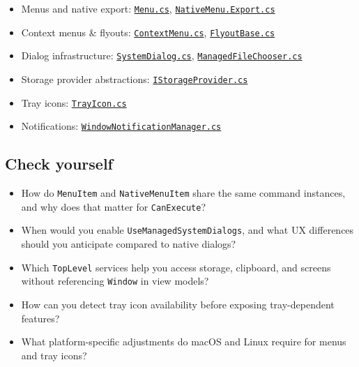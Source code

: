 \begin{itemize}
\tightlist
\item
  Menus and native export:
  \href{https://github.com/AvaloniaUI/Avalonia/blob/master/src/Avalonia.Controls/Menu.cs}{\passthrough{\lstinline!Menu.cs!}},
  \href{https://github.com/AvaloniaUI/Avalonia/blob/master/src/Avalonia.Controls/NativeMenu.Export.cs}{\passthrough{\lstinline!NativeMenu.Export.cs!}}
\item
  Context menus \& flyouts:
  \href{https://github.com/AvaloniaUI/Avalonia/blob/master/src/Avalonia.Controls/ContextMenu.cs}{\passthrough{\lstinline!ContextMenu.cs!}},
  \href{https://github.com/AvaloniaUI/Avalonia/blob/master/src/Avalonia.Controls/Flyouts/FlyoutBase.cs}{\passthrough{\lstinline!FlyoutBase.cs!}}
\item
  Dialog infrastructure:
  \href{https://github.com/AvaloniaUI/Avalonia/blob/master/src/Avalonia.Controls/SystemDialog.cs}{\passthrough{\lstinline!SystemDialog.cs!}},
  \href{https://github.com/AvaloniaUI/Avalonia/blob/master/src/Avalonia.Dialogs/ManagedFileChooser.cs}{\passthrough{\lstinline!ManagedFileChooser.cs!}}
\item
  Storage provider abstractions:
  \href{https://github.com/AvaloniaUI/Avalonia/blob/master/src/Avalonia.Base/Platform/Storage/IStorageProvider.cs}{\passthrough{\lstinline!IStorageProvider.cs!}}
\item
  Tray icons:
  \href{https://github.com/AvaloniaUI/Avalonia/blob/master/src/Avalonia.Controls/TrayIcon.cs}{\passthrough{\lstinline!TrayIcon.cs!}}
\item
  Notifications:
  \href{https://github.com/AvaloniaUI/Avalonia/blob/master/src/Avalonia.Controls.Notifications/WindowNotificationManager.cs}{\passthrough{\lstinline!WindowNotificationManager.cs!}}
\end{itemize}

\subsection{Check yourself}\label{check-yourself-11}

\begin{itemize}
\tightlist
\item
  How do \passthrough{\lstinline!MenuItem!} and
  \passthrough{\lstinline!NativeMenuItem!} share the same command
  instances, and why does that matter for
  \passthrough{\lstinline!CanExecute!}?
\item
  When would you enable
  \passthrough{\lstinline!UseManagedSystemDialogs!}, and what UX
  differences should you anticipate compared to native dialogs?
\item
  Which \passthrough{\lstinline!TopLevel!} services help you access
  storage, clipboard, and screens without referencing
  \passthrough{\lstinline!Window!} in view models?
\item
  How can you detect tray icon availability before exposing
  tray-dependent features?
\item
  What platform-specific adjustments do macOS and Linux require for
  menus and tray icons?
\end{itemize}

